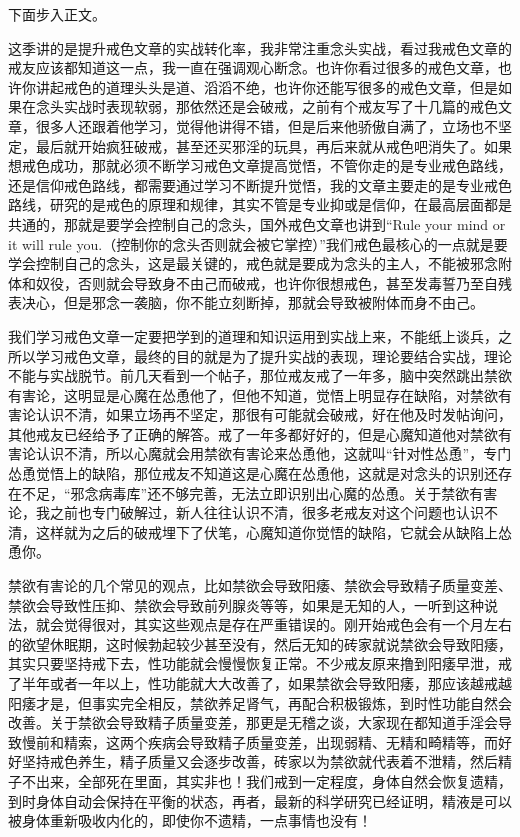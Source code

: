下面步入正文。

这季讲的是提升戒色文章的实战转化率，我非常注重念头实战，看过我戒色文章的戒友应该都知道这一点，我一直在强调观心断念。也许你看过很多的戒色文章，也许你讲起戒色的道理头头是道、滔滔不绝，也许你还能写很多的戒色文章，但是如果在念头实战时表现软弱，那依然还是会破戒，之前有个戒友写了十几篇的戒色文章，很多人还跟着他学习，觉得他讲得不错，但是后来他骄傲自满了，立场也不坚定，最后就开始疯狂破戒，甚至还买邪淫的玩具，再后来就从戒色吧消失了。如果想戒色成功，那就必须不断学习戒色文章提高觉悟，不管你走的是专业戒色路线，还是信仰戒色路线，都需要通过学习不断提升觉悟，我的文章主要走的是专业戒色路线，研究的是戒色的原理和规律，其实不管是专业抑或是信仰，在最高层面都是共通的，那就是要学会控制自己的念头，国外戒色文章也讲到“Rule your mind or it will rule you.（控制你的念头否则就会被它掌控）”我们戒色最核心的一点就是要学会控制自己的念头，这是最关键的，戒色就是要成为念头的主人，不能被邪念附体和奴役，否则就会导致身不由己而破戒，也许你很想戒色，甚至发毒誓乃至自残表决心，但是邪念一袭脑，你不能立刻断掉，那就会导致被附体而身不由己。

我们学习戒色文章一定要把学到的道理和知识运用到实战上来，不能纸上谈兵，之所以学习戒色文章，最终的目的就是为了提升实战的表现，理论要结合实战，理论不能与实战脱节。前几天看到一个帖子，那位戒友戒了一年多，脑中突然跳出禁欲有害论，这明显是心魔在怂恿他了，但他不知道，觉悟上明显存在缺陷，对禁欲有害论认识不清，如果立场再不坚定，那很有可能就会破戒，好在他及时发帖询问，其他戒友已经给予了正确的解答。戒了一年多都好好的，但是心魔知道他对禁欲有害论认识不清，所以心魔就会用禁欲有害论来怂恿他，这就叫“针对性怂恿”，专门怂恿觉悟上的缺陷，那位戒友不知道这是心魔在怂恿他，这就是对念头的识别还存在不足，“邪念病毒库”还不够完善，无法立即识别出心魔的怂恿。关于禁欲有害论，我之前也专门破解过，新人往往认识不清，很多老戒友对这个问题也认识不清，这样就为之后的破戒埋下了伏笔，心魔知道你觉悟的缺陷，它就会从缺陷上怂恿你。

禁欲有害论的几个常见的观点，比如禁欲会导致阳痿、禁欲会导致精子质量变差、禁欲会导致性压抑、禁欲会导致前列腺炎等等，如果是无知的人，一听到这种说法，就会觉得很对，其实这些观点是存在严重错误的。刚开始戒色会有一个月左右的欲望休眠期，这时候勃起较少甚至没有，然后无知的砖家就说禁欲会导致阳痿，其实只要坚持戒下去，性功能就会慢慢恢复正常。不少戒友原来撸到阳痿早泄，戒了半年或者一年以上，性功能就大大改善了，如果禁欲会导致阳痿，那应该越戒越阳痿才是，但事实完全相反，禁欲养足肾气，再配合积极锻炼，到时性功能自然会改善。关于禁欲会导致精子质量变差，那更是无稽之谈，大家现在都知道手淫会导致慢前和精索，这两个疾病会导致精子质量变差，出现弱精、无精和畸精等，而好好坚持戒色养生，精子质量又会逐步改善，砖家以为禁欲就代表着不泄精，然后精子不出来，全部死在里面，其实非也！我们戒到一定程度，身体自然会恢复遗精，到时身体自动会保持在平衡的状态，再者，最新的科学研究已经证明，精液是可以被身体重新吸收内化的，即使你不遗精，一点事情也没有！

